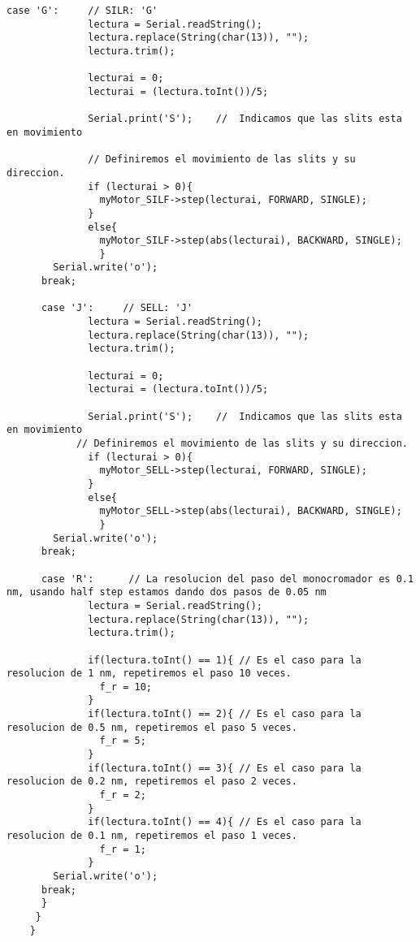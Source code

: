 \begin{lstlisting}[style=Arduino]
      case 'G':     // SILR: 'G'
              lectura = Serial.readString();
              lectura.replace(String(char(13)), "");
              lectura.trim();
              
              lecturai = 0;
              lecturai = (lectura.toInt())/5;
              
              Serial.print('S');    //  Indicamos que las slits esta en movimiento
              
              // Definiremos el movimiento de las slits y su direccion.
              if (lecturai > 0){
                myMotor_SILF->step(lecturai, FORWARD, SINGLE);
              }
              else{
                myMotor_SILF->step(abs(lecturai), BACKWARD, SINGLE);
                }
        Serial.write('o');
      break;
    
      case 'J':     // SELL: 'J'
              lectura = Serial.readString();
              lectura.replace(String(char(13)), "");
              lectura.trim();
              
              lecturai = 0;
              lecturai = (lectura.toInt())/5;
              
              Serial.print('S');    //  Indicamos que las slits esta en movimiento
            // Definiremos el movimiento de las slits y su direccion.
              if (lecturai > 0){
                myMotor_SELL->step(lecturai, FORWARD, SINGLE);
              }
              else{
                myMotor_SELL->step(abs(lecturai), BACKWARD, SINGLE);
                }
        Serial.write('o');
      break;
      
      case 'R':      // La resolucion del paso del monocromador es 0.1 nm, usando half step estamos dando dos pasos de 0.05 nm
              lectura = Serial.readString();
              lectura.replace(String(char(13)), "");
              lectura.trim();
    
              if(lectura.toInt() == 1){ // Es el caso para la resolucion de 1 nm, repetiremos el paso 10 veces.
                f_r = 10;
              }
              if(lectura.toInt() == 2){ // Es el caso para la resolucion de 0.5 nm, repetiremos el paso 5 veces.
                f_r = 5;
              }
              if(lectura.toInt() == 3){ // Es el caso para la resolucion de 0.2 nm, repetiremos el paso 2 veces.
                f_r = 2;
              }
              if(lectura.toInt() == 4){ // Es el caso para la resolucion de 0.1 nm, repetiremos el paso 1 veces.
                f_r = 1;
              }
        Serial.write('o');
      break;
      }
     }
    }
\end{lstlisting}

